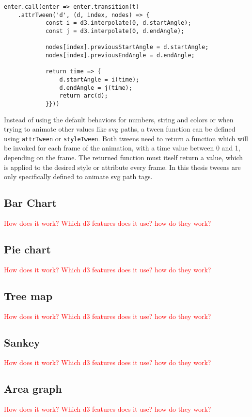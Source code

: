 \begin{lstlisting}[style=htmlcssjs]
    enter.call(enter => enter.transition(t)
    .attrTween('d', (d, index, nodes) => {
            const i = d3.interpolate(0, d.startAngle);
            const j = d3.interpolate(0, d.endAngle);

            nodes[index].previousStartAngle = d.startAngle;
            nodes[index].previousEndAngle = d.endAngle;

            return time => {
                d.startAngle = i(time);
                d.endAngle = j(time);
                return arc(d);
            }}))
\end{lstlisting}

Instead of using the default behaviors for numbers, string and colors or when trying to animate other values like svg paths, a tween function can be defined using \verb|attrTween| or \verb|styleTween|. Both tweens need to return a function which will be invoked for each frame of the animation, with a time value between 0 and 1, depending on the frame. The returned function must itself return a value, which is applied to the desired style or attribute every frame. In this thesis tweens are only specifically defined to animate svg path tags.


\subsection{Bar Chart}
\textcolor{red}{
How does it work? Which d3 features does it use? how do they work?}

\subsection{Pie chart}
\textcolor{red}{
How does it work? Which d3 features does it use? how do they work?}

\subsection{Tree map}
\textcolor{red}{
How does it work? Which d3 features does it use? how do they work?}

\subsection{Sankey}
\textcolor{red}{
How does it work? Which d3 features does it use? how do they work?}

\subsection{Area graph}
\textcolor{red}{
How does it work? Which d3 features does it use? how do they work?}

